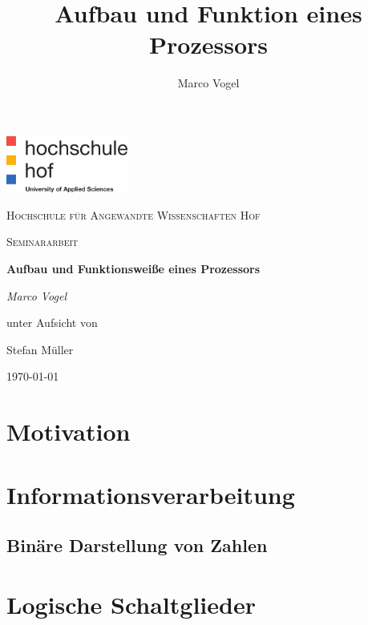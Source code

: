 \documentclass[12pt]{article}
\begin{document}
\begin{titlepage}
	\centering
	\includegraphics[width=0.3\textwidth]{logo}\par\vspace{1cm}
	{\scshape\LARGE Hochschule für Angewandte Wissenschaften Hof \par}
	\vspace{1cm}
	{\scshape\Large Seminararbeit\par}
	\vspace{1.5cm}
	{\huge\bfseries Aufbau und Funktionsweiße eines Prozessors\par}
	\vspace{2cm}
	{\Large\itshape Marco Vogel\par}
	\vfill
	unter Aufsicht von\par
	Stefan Müller

	\vfill

	{\large \today\par}
\end{titlepage}
\newpage




\title{Aufbau und Funktion eines Prozessors}
\author{Marco Vogel}
\maketitle
\newpage

\tableofcontents
\newpage
\listoffigures



\section{Motivation}
\section{Informationsverarbeitung}
\subsection{Binäre Darstellung von Zahlen}

\section{Logische Schaltglieder}
\end{document}
